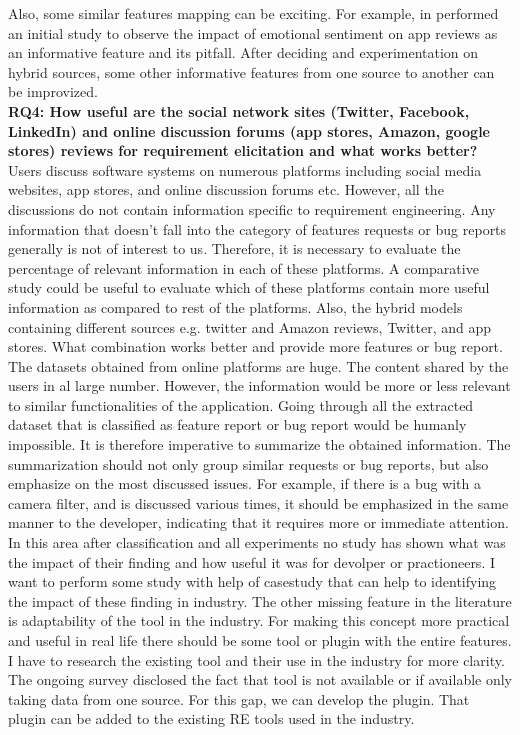 	Also, some similar features mapping can be exciting. For example, in \cite{Martens:2017} performed an initial study to observe the impact of emotional sentiment on app reviews as an informative feature and its pitfall. After deciding and experimentation on hybrid sources, some other informative features from one source to another can be improvized.\\

\textbf{RQ4: How useful are the social network sites (Twitter, Facebook, LinkedIn) and online
discussion forums (app stores, Amazon, google stores) reviews for requirement elicitation
and what works better?}\\
Users discuss software systems on numerous platforms including social media websites,
app stores, and online discussion forums etc. However, all the discussions do not contain
information specific to requirement engineering. Any information that doesn’t fall into the
category of features requests or bug reports generally is not of interest to us. Therefore, it is
necessary to evaluate the percentage of relevant information in each of these platforms. A
comparative study could be useful to evaluate which of these platforms contain more useful
information as compared to rest of the platforms. Also, the hybrid models containing different
sources e.g. twitter and Amazon reviews, Twitter, and app stores. What combination works better
and provide more features or bug report.\\

	The datasets obtained from online platforms are huge. The content shared by the users in al large number. However, the information would be more or less relevant to similar
functionalities of the application. Going through all the extracted dataset that is classified as
feature report or bug report would be humanly impossible. It is therefore imperative to
summarize the obtained information. The summarization should not only group similar requests
or bug reports, but also emphasize on the most discussed issues. For example, if there is a bug
with a camera filter, and is discussed various times, it should be emphasized in the same manner
to the developer, indicating that it requires more or immediate attention.\\

	In this area after classification and all experiments no study has shown what was the impact 
of their finding and how useful it was for devolper or practioneers. I want to perform some study with help of  casestudy that can help to identifying the impact
 of these finding in industry. The other missing feature in the literature is adaptability of the tool in the industry. For making
this concept more practical and useful in real life there should be some tool or plugin with
the entire features. I have to research the existing tool and their use in the industry for more
clarity. The ongoing survey disclosed the fact that tool is not available or if available only
taking data from one source. For this gap, we can develop the plugin. That plugin can be added
to the existing RE tools used in the industry.